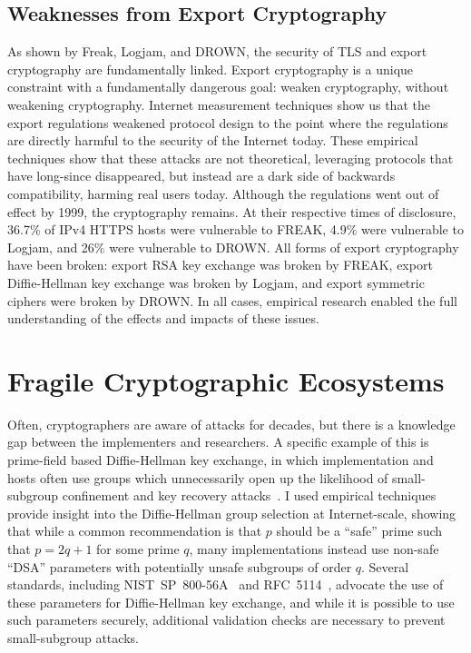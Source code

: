 \subsection{Weaknesses from Export Cryptography}

As shown by Freak, Logjam, and DROWN, the security of TLS and export
cryptography are fundamentally linked. Export cryptography is a unique
constraint with a fundamentally dangerous goal: weaken cryptography, without
weakening cryptography. Internet measurement techniques show us that the export
regulations weakened protocol design to the point where the regulations are
directly harmful to the security of the Internet today. These empirical
techniques show that these attacks are not theoretical, leveraging protocols
that have long-since disappeared, but instead are a dark side of backwards
compatibility, harming real users today. Although the regulations went out of
effect by 1999, the cryptography remains. At their respective times of
disclosure, 36.7\% of IPv4 HTTPS hosts were vulnerable to FREAK, 4.9\% were
vulnerable to Logjam, and 26\% were vulnerable to DROWN. All forms of export
cryptography have been broken: export RSA key exchange was broken by FREAK,
export Diffie-Hellman key exchange was broken by Logjam, and export symmetric
ciphers were broken by DROWN. In all cases, empirical research enabled the full
understanding of the effects and impacts of these issues.

\section{Fragile Cryptographic Ecosystems}

Often, cryptographers are aware of attacks for decades, but there is a
knowledge gap between the implementers and researchers. A specific example of
this is prime-field based Diffie-Hellman key exchange, in which
implementation and hosts often use groups which unnecessarily open up the
likelihood of small-subgroup confinement and key recovery
attacks~\cite{subgroup-2017}. I used empirical techniques provide insight
into the Diffie-Hellman group selection at Internet-scale, showing that while
a common recommendation is that $p$ should be a ``safe'' prime such that $p =
2q+1$ for some prime $q$, many implementations instead use non-safe ``DSA''
parameters with potentially unsafe subgroups of order $q$. Several standards,
including NIST~SP~800-56A~\cite{sp800} and RFC~5114~\cite{rfc5114}, advocate
the use of these parameters for Diffie-Hellman key exchange, and while it is
possible to use such parameters securely, additional validation checks are
necessary to prevent small-subgroup attacks.

